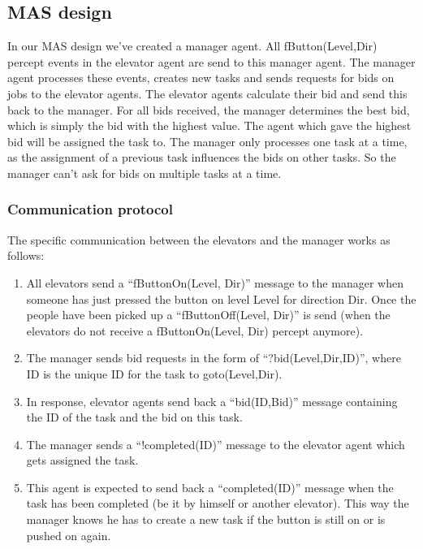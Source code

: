 \documentclass[a4paper,11pt]{article}
\begin{document}
\subsection{MAS design}
In our MAS design we've created a manager agent. All fButton(Level,Dir) percept events in the elevator agent are send to this manager agent. The manager agent processes these events, creates new tasks and sends requests for bids on jobs to the elevator agents. The elevator agents calculate their bid and send this back to the manager. For all bids received, the manager determines the best bid, which is simply the bid with the highest value. The agent which gave the highest bid will be assigned the task to. The manager only processes one task at a time, as the assignment of a previous task influences the bids on other tasks. So the manager can't ask for bids on multiple tasks at a time. 

\subsubsection{Communication protocol}
The specific communication between the elevators and the manager works as follows:
\begin{enumerate}
	\item All elevators send a ``fButtonOn(Level, Dir)'' message to the manager when someone has just pressed the button on level Level for direction Dir. Once the people have been picked up a  ``fButtonOff(Level, Dir)'' is send (when the elevators do not receive a fButtonOn(Level, Dir) percept anymore).
	\item The manager sends bid requests in the form of ``?bid(Level,Dir,ID)'', where ID is the unique ID for the task to goto(Level,Dir).
	\item In response, elevator agents send back a ``bid(ID,Bid)'' message containing the ID of the task and the bid on this task.
	\item The manager sends a ``!completed(ID)'' message to the elevator agent which gets assigned the task.
	\item This agent is expected to send back a ``completed(ID)'' message when the task has been completed (be it by himself or another elevator). This way the manager knows he has to create a new task if the button is still on or is pushed on again. 
\end{enumerate}
\end{document}
